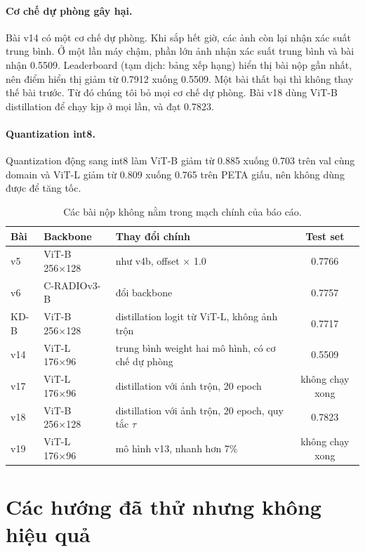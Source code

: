 \documentclass[11pt,a4paper]{article}
\begin{document}
\paragraph{Cơ chế dự phòng gây hại.} Bài v14 có một cơ chế dự phòng. Khi sắp hết giờ, các ảnh còn lại nhận xác suất trung bình. Ở một lần máy chậm, phần lớn ảnh nhận xác suất trung bình và bài nhận 0.5509. Leaderboard (tạm dịch: bảng xếp hạng) hiển thị bài nộp gần nhất, nên điểm hiển thị giảm từ 0.7912 xuống 0.5509. Một bài thất bại thì không thay thế bài trước. Từ đó chúng tôi bỏ mọi cơ chế dự phòng. Bài v18 dùng ViT-B distillation để chạy kịp ở mọi lần, và đạt 0.7823.

\paragraph{Quantization int8.} Quantization động sang int8 làm ViT-B giảm từ 0.885 xuống 0.703 trên val cùng domain và ViT-L giảm từ 0.809 xuống 0.765 trên PETA giấu, nên không dùng được để tăng tốc.

\begin{table}[H]
\centering\small
\begin{tabularx}{\linewidth}{@{}llXc@{}}
\toprule
Bài & Backbone & Thay đổi chính & Test set \\
\midrule
v5 & ViT-B 256×128 & như v4b, offset × 1.0 & 0.7766 \\
v6 & C-RADIOv3-B & đổi backbone & 0.7757 \\
KD-B & ViT-B 256×128 & distillation logit từ ViT-L, không ảnh trộn & 0.7717 \\
v14 & ViT-L 176×96 & trung bình weight hai mô hình, có cơ chế dự phòng & 0.5509 \\
v17 & ViT-L 176×96 & distillation với ảnh trộn, 20 epoch & không chạy xong \\
v18 & ViT-B 256×128 & distillation với ảnh trộn, 20 epoch, quy tắc $\tau$ & 0.7823 \\
v19 & ViT-L 176×96 & mô hình v13, nhanh hơn 7\% & không chạy xong \\
\bottomrule
\end{tabularx}
\caption{Các bài nộp không nằm trong mạch chính của báo cáo.}
\end{table}

\section{Các hướng đã thử nhưng không hiệu quả}
\label{app:neg}
\end{document}
